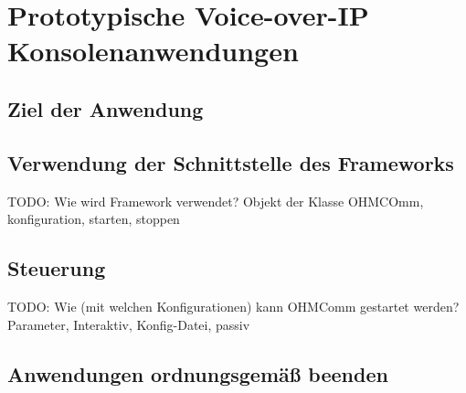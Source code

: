 \chapter{Prototypische Voice-over-IP Konsolenanwendungen}
\label{prototypProgram}
\section{Ziel der Anwendung}
\section{Verwendung der Schnittstelle des Frameworks}
TODO: Wie wird Framework verwendet? Objekt der Klasse OHMCOmm, konfiguration, starten, stoppen
\section{Steuerung}
TODO: Wie (mit welchen Konfigurationen) kann OHMComm gestartet werden? Parameter, Interaktiv, Konfig-Datei, passiv
\section{Anwendungen ordnungsgemäß beenden}
